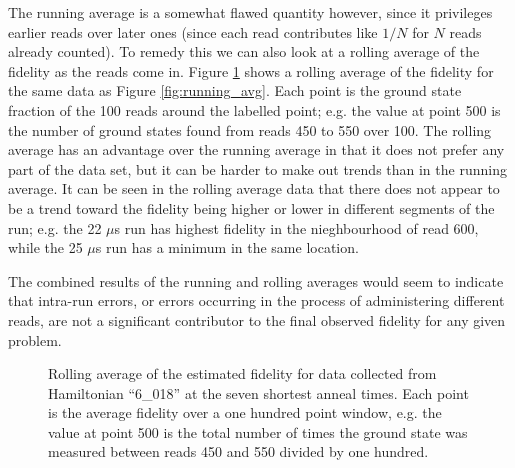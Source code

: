 The running average is a somewhat flawed quantity however, since it privileges earlier reads over later ones (since each read contributes like $1/N$ for $N$ reads already counted).  To remedy this we can also look at a rolling average of the fidelity as the reads come in.  Figure \ref{fig:rolling_avg} shows a rolling average of the fidelity for the same data as Figure \ref{fig:running_avg}.  Each point is the ground state fraction of the 100 reads around the labelled point; e.g. the value at point 500 is the number of ground states found from reads 450 to 550 over 100.  The rolling average has an advantage over the running average in that it does not prefer any part of the data set, but it can be harder to make out trends than in the running average.  It can be seen in the rolling average data that there does not appear to be a trend toward the fidelity being higher or lower in different segments of the run; e.g. the 22 $\mu$s run has highest fidelity in the nieghbourhood of read 600, while the 25 $\mu$s run has a minimum in the same location.

The combined results of the running and rolling averages would seem to indicate that intra-run errors, or errors occurring in the process of administering different reads, are not a significant contributor to the final observed fidelity for any given problem.

\begin{figure}
	\caption[Rolling Fidelity Average]{Rolling average of the estimated fidelity for data collected from Hamiltonian ``6\_018'' at the seven shortest anneal times.  Each point is the average fidelity over a one hundred point window, e.g. the value at point 500 is the total number of times the ground state was measured between reads 450 and 550 divided by one hundred.}
	\label{fig:rolling_avg}
\end{figure}

